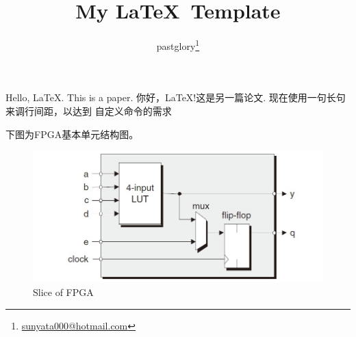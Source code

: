 \documentclass{report}
\title {My \LaTeX\ Template}
\author{pastglory\thanks{\href{mailto:sunyata000@hotmail.com}{sunyata000@hotmail.com}}}
\begin{document}
\maketitle

Hello, \LaTeX.
This is a paper\cite{zhang2020sparch}.
你好，\LaTeX!这是另一篇论文\cite{sadi2017design}. 现在使用一句长句来调行间距，以达到
自定义命令的需求

下图为FPGA基本单元结构图。
\begin{figure}[H] %
    \centering
    \includegraphics{img/FPGA.jpg}
    \caption{Slice of FPGA} %
    \label{图1} %
\end{figure}


\end{document}
